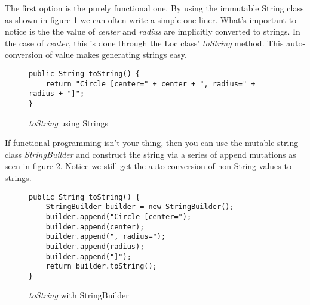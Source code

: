 \documentclass[]{tufte-handout}
\begin{document}
The first option is the purely functional one. By using the immutable String class as shown in figure \ref{fig:tSwithString} we can often write a simple one liner. What's important to notice is the the value of \textit{center} and \textit{radius} are implicitly converted to strings. In the case of \textit{center}, this is done through the Loc class' \textit{toString} method. This auto-conversion of value makes generating strings easy. 
\begin{figure}[!ht]
\begin{lstlisting}
public String toString() {
	return "Circle [center=" + center + ", radius=" + radius + "]";
}
\end{lstlisting}
\label{fig:tSwithString}
\caption{\textit{toString} using Strings}
\end{figure}

If functional programming isn't your thing, then you can use the mutable string class \textit{StringBuilder} and construct the string via a series of append mutations as seen in figure \ref{fig:tSwithStrBuild}. Notice we still get the auto-conversion of non-String values to strings. 
\begin{figure}[!ht]
\begin{lstlisting}
public String toString() {
	StringBuilder builder = new StringBuilder();
	builder.append("Circle [center=");
	builder.append(center);
	builder.append(", radius=");
	builder.append(radius);
	builder.append("]");
	return builder.toString();
}
\end{lstlisting}
\label{fig:tSwithStrBuild}
\caption{\textit{toString} with StringBuilder}
\end{figure}
\end{document}
